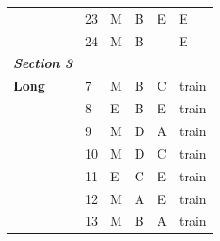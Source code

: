 \documentclass[pageno]{final_paper}
\newcommand{\textbi}[1]{\textbf{\textit{#1}}}
\begin{document}
\begin{table}[]
\begin{tabular}{llllll}
\textbf{}                & 23                                  & M                                       & B                                           & E                                          & E                                           \\
\textbf{}                & 24                                  & M                                       & B                                           & \g{B}                                          & E                                           \\ \midrule
\textbi{Section 3}       &                                     &                                         &                                             &                                            &                                             \\ \midrule
\textbf{Long}            & 7                                   & M                                       & B                                           & C                                          & train                                       \\
\textbf{}                & 8                                   & E                                       & B                                           & E                                          & train                                       \\
\textbf{}                & 9                                   & M                                       & D                                           & A                                          & train                                       \\
\textbf{}                & 10                                  & M                                       & D                                           & C                                          & train                                       \\
\textbf{}                & 11                                  & E                                       & C                                           & E                                          & train                                       \\
\textbf{}                & 12                                  & M                                       & A                                           & E                                          & train                                       \\
\textbf{}                & 13                                  & M                                       & B                                           & A                                          & train                                       \\

\end{tabular}
\end{table}
\end{document}
